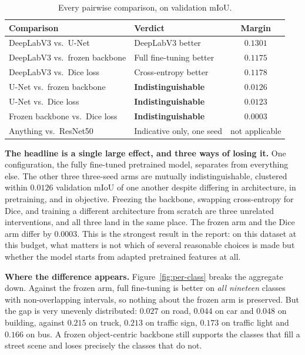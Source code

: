 \begin{table}[H]
\centering
\caption{Every pairwise comparison, on validation mIoU.}
\label{tab:verdicts}
\small
\begin{tabular}{llc}
\hline
\textbf{Comparison} & \textbf{Verdict} & \textbf{Margin} \\
\hline
DeepLabV3 vs.\ U-Net            & DeepLabV3 better           & $0.1301$ \\
DeepLabV3 vs.\ frozen backbone  & Full fine-tuning better    & $0.1175$ \\
DeepLabV3 vs.\ Dice loss        & Cross-entropy better       & $0.1178$ \\
U-Net vs.\ frozen backbone      & \textbf{Indistinguishable} & $0.0126$ \\
U-Net vs.\ Dice loss            & \textbf{Indistinguishable} & $0.0123$ \\
Frozen backbone vs.\ Dice loss  & \textbf{Indistinguishable} & $0.0003$ \\
Anything vs.\ ResNet50          & Indicative only, one seed  & not applicable \\
\hline
\end{tabular}
\end{table}

\textbf{The headline is a single large effect, and three ways of losing it.} One configuration,
the fully fine-tuned pretrained model, separates from everything else. The other three
three-seed arms are mutually indistinguishable, clustered within $0.0126$ validation mIoU of one
another despite differing in architecture, in pretraining, and in objective. Freezing the
backbone, swapping cross-entropy for Dice, and training a different architecture from scratch are
three unrelated interventions, and all three land in the same place. The frozen arm and the Dice
arm differ by $0.0003$. This is the strongest result in the report: on this dataset at this
budget, what matters is not which of several reasonable choices is made but whether the model
starts from adapted pretrained features at all.

\textbf{Where the difference appears.} Figure~\ref{fig:per-class} breaks the aggregate down.
Against the frozen arm, full fine-tuning is better on \emph{all nineteen} classes with
non-overlapping intervals, so nothing about the frozen arm is preserved. But the gap is very
unevenly distributed: $0.027$ on road, $0.044$ on car and $0.048$ on building, against $0.215$ on
truck, $0.213$ on traffic sign, $0.173$ on traffic light and $0.166$ on bus. A frozen
object-centric backbone still supports the classes that fill a street scene and loses precisely
the classes that do not.

